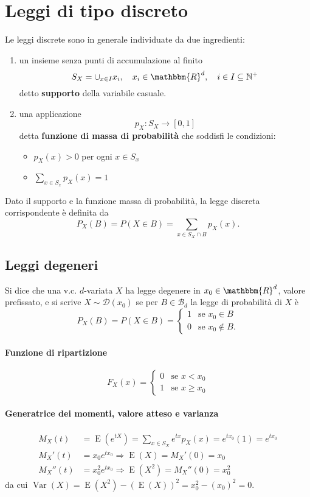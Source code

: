 \documentclass[11pt,a4paper,twoside]{article}
\let\geq\geqslant%
\newcommand\N{\mathbb{N}}
\newcommand\R{\mathbbm{R}}
\newcommand\B{\mathcal{B}}
\newcommand\D{\mathcal{D}}
\DeclareMathOperator{\Var}{Var}
\DeclareMathOperator{\E}{E}
\begin{document}
\section{Leggi di tipo discreto}
Le leggi discrete sono in generale individuate da due ingredienti:
\begin{enumerate}
\item un insieme senza punti di accumulazione al finito
  \[
    S_X = \cup_{x\in I}{x_i}, \quad x_i\in\R^d,\quad i\in I\subseteq \N^+
  \]
  detto \textbf{supporto} della variabile casuale.  
\item una applicazione
  \[
    p_X : S_X \rightarrow [0, 1]
  \]
  detta \textbf{funzione di massa di probabilità} che soddisfi le
  condizioni:
  \begin{itemize}
  \item \(p_X(x) > 0\) per ogni \(x\in S_x\)
  \item \(\sum_{x\in S_x} p_X(x) = 1\)
  \end{itemize}
\end{enumerate}

Dato il supporto e la funzione massa di probabilità, la legge discreta
corrispondente è definita da
\[
  P_X(B) = P(X\in B) = \sum_{x\in S_X \cap B} p_X(x).
\]

\subsection{Leggi degeneri}
Si dice che una v.c. \(d\)-variata \(X\) ha legge degenere in
\(x_0\in \R^d\), valore prefissato, e si scrive \(X\sim \D(x_0)\) se
per \(B\in\B_d\) la legge di probabilità di \(X\) è
\[
  P_X(B) = P(X\in B) = \begin{cases}
    1 & \mbox{se } x_0\in B \\
    0 & \mbox{se } x_0 \not\in B .
  \end{cases}
\]

\paragraph{Funzione di ripartizione}
\[
  F_X(x) = \begin{cases}
    0 & \mbox{se } x < x_0 \\
    1 & \mbox{se } x \geq x_0
  \end{cases}
\]

\paragraph{Generatrice dei momenti, valore atteso e varianza}
\begin{align*}
  M_X(t) &= \E(e^{tX}) = \sum_{x\in S_X} e^{tx} p_X(x) = e^{t x_0} (1)
           = e^{t x_0} \\
  M_X'(t) &= x_0 e^{tx_0} \Rightarrow \E(X) = M_X'(0) = x_0 \\
  M_X''(t) &= x_0^2e^{t x_0} \Rightarrow \E(X^2) = M_X''(0) = x_0^2
\end{align*}
da cui \(\Var(X) = \E(X^2) - (\E(X))^2 = x_0^2 - (x_0)^2 = 0\).
\end{document}
